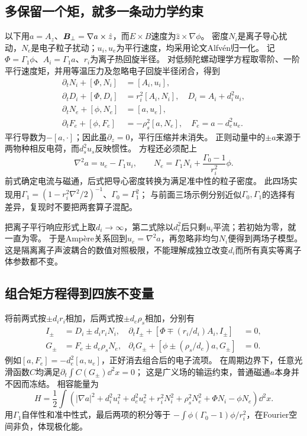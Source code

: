 \subsection{多保留一个矩，就多一条动力学约束}
以下用$a=A_z$、$\bm{B}_\perp=\nabla a\times\hat z$，而$E\times B$速度为$\hat z\times\nabla\phi$。
密度$N_i$是离子导心扰动，$N_e$是电子粒子扰动；$u_i,u_e$为平行速度，均采用论文Alfvén归一化。
记$\Phi=\Gamma_1\phi$、$A_i=\Gamma_1a$、$r_i$为离子热回旋半径。
对低频陀螺动理学方程取零阶、一阶平行速度矩，并用等温压力及忽略电子回旋半径闭合，得到
\begin{align}
 \partial_tN_i+[\Phi,N_i]&=[A_i,u_i],\\
 \partial_tD_i+[\Phi,D_i]&=r_i^2[A_i,N_i],\quad D_i=A_i+d_i^2u_i,\\
 \partial_tN_e+[\phi,N_e]&=[a,u_e],\\
 \partial_tF_e+[\phi,F_e]&=-\rho_s^2[a,N_e],\quad F_e=a-d_e^2u_e.
 \label{eq:gyrofour}
\end{align}
平行导数为$-[a,\cdot]$；因此虽$\partial_z=0$，平行压缩并未消失。
正则动量中的$\pm a$来源于两物种相反电荷，而$d_s^2u_s$反映惯性。
方程还必须配上
\begin{equation}
 \nabla^2a=u_e-\Gamma_1u_i,\qquad
 N_e=\Gamma_1N_i+\frac{\Gamma_0-1}{r_i^2}\phi.
 \label{eq:gyrofourconstraints}
\end{equation}
前式确定电流与磁通，后式把导心密度转换为满足准中性的粒子密度。
此四场实现用$\Gamma_1=(1-r_i^2\nabla^2/2)^{-1}$、$\Gamma_0=\Gamma_1^2$；
与前面三场示例分别近似$\Gamma_0,\Gamma_1$的选择有差异，复现时不要把两套算子混配。\citep{F672,E475}

把离子平行响应形式上取$d_i\to\infty$，第二式除以$d_i^2$后只剩$u_i$平流；若初始为零，就一直为零。
于是Ampère关系回到$u_e=\nabla^2a$，再忽略非均匀$N_i$便得到两场子模型。
这是隔离离子声波耦合的数值对照极限，不能理解成独立改变$d_i$而所有真实等离子体参数都不变。

\subsection{组合矩方程得到四族不变量}
将前两式按$\pm d_ir_i$相加，后两式按$\pm d_e\rho_s$相加，分别有
\begin{align}
 I_\pm&=D_i\pm d_ir_iN_i,&
 \partial_tI_\pm+[\Phi\mp(r_i/d_i)A_i,I_\pm]&=0,\\
 G_\pm&=F_e\pm d_e\rho_sN_e,&
 \partial_tG_\pm+[\phi\pm(\rho_s/d_e)a,G_\pm]&=0.
\end{align}
例如$[a,F_e]=-d_e^2[a,u_e]$，正好消去组合后的电子流项。
在周期边界下，任意光滑函数$C$均满足$\partial_t\int C(G_\pm)\dd^2x=0$；
这是广义场的输运约束，普通磁通$a$本身并不因而冻结。
相容能量为
\begin{equation}
 H=\frac12\int\left(|\nabla a|^2+d_i^2u_i^2+d_e^2u_e^2
 +r_i^2N_i^2+\rho_s^2N_e^2+\Phi N_i-\phi N_e\right)\dd^2x.
\end{equation}
用$\Gamma_1$自伴性和准中性式，最后两项的积分等于
$-\int\phi(\Gamma_0-1)\phi/r_i^2$，在Fourier空间非负，体现极化能。

